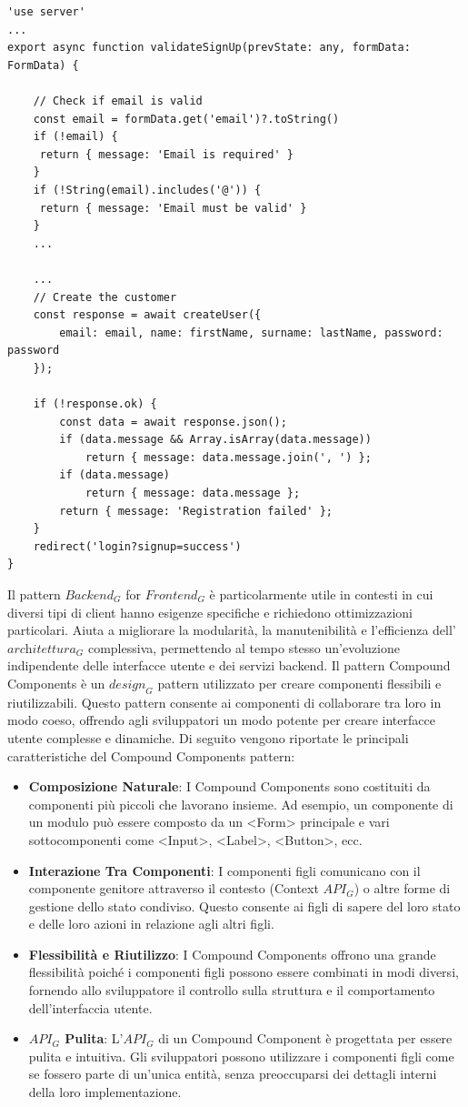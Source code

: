 \newpage
\begin{lstlisting}[style=ES6, caption={Esempio di $\textit{Backend}_G$ for Frontend}]
'use server'
...
export async function validateSignUp(prevState: any, formData: FormData) {

	// Check if email is valid
	const email = formData.get('email')?.toString()
	if (!email) {
	 return { message: 'Email is required' }
	}
	if (!String(email).includes('@')) {
	 return { message: 'Email must be valid' }
	}
    ...

    ...
	// Create the customer
	const response = await createUser({ 
		email: email, name: firstName, surname: lastName, password: password 
	});

	if (!response.ok) {
		const data = await response.json();
		if (data.message && Array.isArray(data.message))
			return { message: data.message.join(', ') };
		if (data.message)
			return { message: data.message };
		return { message: 'Registration failed' };
	}
	redirect('login?signup=success')
}
\end{lstlisting}
Il pattern $\textit{Backend}_G$ for $\textit{Frontend}_G$ è particolarmente utile in contesti in cui diversi tipi di client hanno esigenze specifiche e richiedono ottimizzazioni particolari. Aiuta a migliorare la modularità, la manutenibilità e l'efficienza dell'$\textit{architettura}_G$ complessiva, permettendo al tempo stesso un'evoluzione indipendente delle interfacce utente e dei servizi backend.
\newpage
{}
Il pattern Compound Components è un $\textit{design}_G$ pattern utilizzato per creare componenti flessibili e riutilizzabili. Questo pattern consente ai componenti di collaborare tra loro in modo coeso, offrendo agli sviluppatori un modo potente per creare interfacce utente complesse e dinamiche.
Di seguito vengono riportate le principali caratteristiche del Compound Components pattern:
\begin{itemize}
    \item \textbf{Composizione Naturale}: I Compound Components sono costituiti da componenti più piccoli che lavorano insieme. Ad esempio, un componente di un modulo può essere composto da un <Form> principale e vari sottocomponenti come <Input>, <Label>, <Button>, ecc.
    \item \textbf{Interazione Tra Componenti}: I componenti figli comunicano con il componente genitore attraverso il contesto (Context $\textit{API}_G$) o altre forme di gestione dello stato condiviso. Questo consente ai figli di sapere del loro stato e delle loro azioni in relazione agli altri figli.
    \item \textbf{Flessibilità e Riutilizzo}: I Compound Components offrono una grande flessibilità poiché i componenti figli possono essere combinati in modi diversi, fornendo allo sviluppatore il controllo sulla struttura e il comportamento dell'interfaccia utente.
    \item \textbf{$\textit{API}_G$ Pulita}: L'$\textit{API}_G$ di un Compound Component è progettata per essere pulita e intuitiva. Gli sviluppatori possono utilizzare i componenti figli come se fossero parte di un'unica entità, senza preoccuparsi dei dettagli interni della loro implementazione.
\end{itemize}
